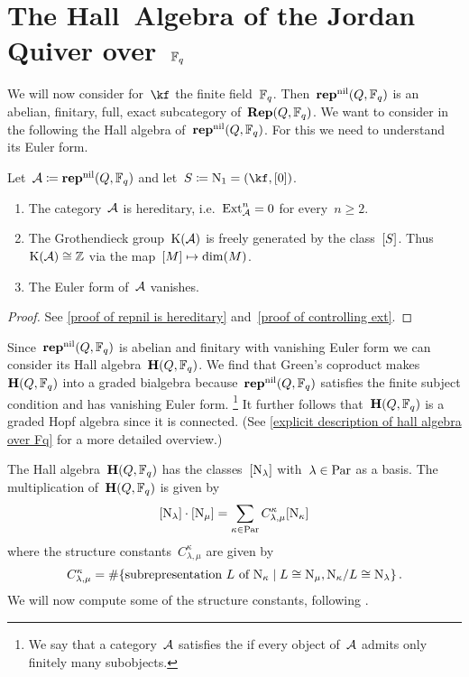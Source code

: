 \documentclass[a4paper,11pt]{scrartcl}
\begin{document}
\section{The Hall~Algebra of the Jordan Quiver over~$\mathbb{F}_q$}

We will now consider for~$\kf$ the finite field~$\mathbb{F}_q$.
Then~$\mathbf{rep}^{\mathrm{nil}}(Q, \mathbb{F}_q)$ is an abelian, finitary, full, exact subcategory of~$\mathbf{Rep}(Q, \mathbb{F}_q)$.
We want to consider in the following the Hall algebra of~$\mathbf{rep}^{\mathrm{nil}}(Q, \mathbb{F}_q)$.
For this we need to understand its Euler form.

\begin{proposition}
  Let~$\mathcal{A} \coloneqq \mathbf{rep}^{\mathrm{nil}}(Q, \mathbb{F}_q)$ and let~$S \defined \Nil_1 = (\kf, [0])$.
  \begin{enumerate}
    \item
      The category~$\mathcal{A}$ is hereditary, i.e.~$\operatorname{Ext}^n_{\mathcal{A}} = 0$ for every~$n \geq 2$.
    \item
      The Grothendieck group~$\operatorname{K}(\mathcal{A})$ is freely generated by the class~$[S]$.
      Thus~$\operatorname{K}(\mathcal{A}) \cong \mathbb{Z}$ via the map~$[M] \mapsto \dim(M)$.
    \item
      The Euler form of~$\mathcal{A}$ vanishes.
  \end{enumerate}
\end{proposition}

\begin{proof}
  See \cref{proof of repnil is hereditary} and~\cref{proof of controlling ext}.
\end{proof}

Since~$\mathbf{rep}^{\mathrm{nil}}(Q, \mathbb{F}_q)$ is abelian and finitary with vanishing Euler form we can consider its Hall algebra~$\mathbf{H}(Q, \mathbb{F}_q)$.
We find that Green’s coproduct makes~$\mathbf{H}(Q, \mathbb{F}_q)$ into a graded bialgebra because~$\mathbf{rep}^{\mathrm{nil}}(Q, \mathbb{F}_q)$ satisfies the finite subject condition and has vanishing Euler form.%
\footnote{%
  We say that a category~$\mathcal{A}$ satisfies the  if every object of~$\mathcal{A}$ admits only finitely many subobjects.
}
It further follows that~$\mathbf{H}(Q, \mathbb{F}_q)$ is a graded Hopf algebra since it is connected.
(See \cref{explicit description of hall algebra over Fq} for a more detailed overview.)

The Hall algebra~$\mathbf{H}(Q, \mathbb{F}_q)$ has the classes~$[\mathrm{N}_\lambda]$ with~$\lambda \in \mathrm{Par}$ as a basis.
The multiplication of~$\mathbf{H}(Q, \mathbb{F}_q)$ is given by
\[
  [\mathrm{N}_\lambda] \cdot [\mathrm{N}_\mu]
  =
  \sum_{\kappa \in \mathrm{Par}}
  C^\kappa_{\lambda, \mu} [\mathrm{N}_\kappa]
\]
where the structure constants~$C^\kappa_{\lambda, \mu}$ are given by
\[
  C^\kappa_{\lambda, \mu}
  =
  \counting
  \{
    \text{subrepresentation~$L$ of~$\Nil_\kappa$}
  \suchthat
    L \cong \Nil_\mu,
    \Nil_\kappa/L \cong \Nil_\lambda
  \} \,.
\]
We will now compute some of the structure constants, following \cite[Example~2.2]{schiffmann_hall}.
\end{document}
